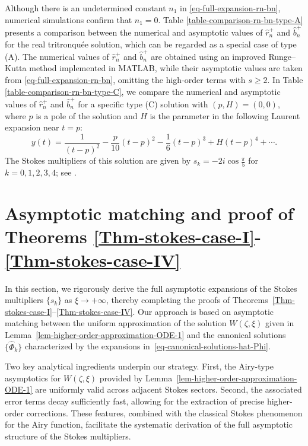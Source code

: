 \documentclass[12pt]{article}
\theoremstyle{plain}
\theoremstyle{definition}
\newtheorem{remark}{\hskip\parindent Remark}
\numberwithin{equation}{section}
\begin{document}
\begin{remark}
Although there is an undetermined constant $n_{1}$ in \eqref{eq-full-expansion-rn-bn}, numerical simulations confirm that $n_{1} = 0$. Table \ref{table-comparison-rn-bn-type-A} presents a comparison between the numerical and asymptotic values of $\hat{r}_{n}^{+}$ and $\hat{b}_{n}^{+}$ for the real tritronqu\'ee solution, which can be regarded as a special case of type (A). The numerical values of $\hat{r}_{n}^{+}$ and $\hat{b}_{n}^{+}$ are obtained using an improved Runge–Kutta method implemented in MATLAB, while their asymptotic values are taken from \eqref{eq-full-expansion-rn-bn}, omitting the high-order terms with $s \geq 2$.
In Table \ref{table-comparison-rn-bn-type-C}, we compare the numerical and asymptotic values of $\hat{r}_{n}^{+}$ and $\hat{b}_{n}^{+}$ for a specific type (C) solution with $(p, H) = (0, 0)$, where $p$ is a pole of the solution and $H$ is the parameter in the following Laurent expansion near $t = p$:
\begin{equation}\label{eq-Laurent-series}
y(t) = \frac{1}{(t - p)^2} - \frac{p}{10}(t - p)^2 - \frac{1}{6}(t - p)^3 + H(t - p)^4 + \cdots.
\end{equation}
The Stokes multipliers of this solution are given by $s_{k} = -2i \cos{\frac{\pi}{5}}$ for $k = 0, 1, 2, 3, 4$; see \cite{Long-Xia}.
\end{remark}







\section{Asymptotic matching and proof of Theorems \ref{Thm-stokes-case-I}-\ref{Thm-stokes-case-IV}}
\label{sec:proof-theorem}


In this section, we rigorously derive the full asymptotic expansions of the Stokes multipliers $\{s_k\}$ as $\xi \to +\infty$, thereby completing the proofs of Theorems~\ref{Thm-stokes-case-I}--\ref{Thm-stokes-case-IV}. Our approach is based on asymptotic matching between the uniform approximation of the solution $W(\zeta,\xi)$ given in Lemma~\ref{lem-higher-order-approximation-ODE-1} and the canonical solutions $\{\widehat{\Phi}_k\}$ characterized by the expansions in~\eqref{eq-canonical-solutions-hat-Phi}.


Two key analytical ingredients underpin our strategy. First, the Airy-type asymptotics for $W(\zeta,\xi)$ provided by Lemma~\ref{lem-higher-order-approximation-ODE-1} are uniformly valid across adjacent Stokes sectors. Second, the associated error terms decay sufficiently fast, allowing for the extraction of precise higher-order corrections. These features, combined with the classical Stokes phenomenon for the Airy function, facilitate the systematic derivation of the full asymptotic structure of the Stokes multipliers.
\end{document}
